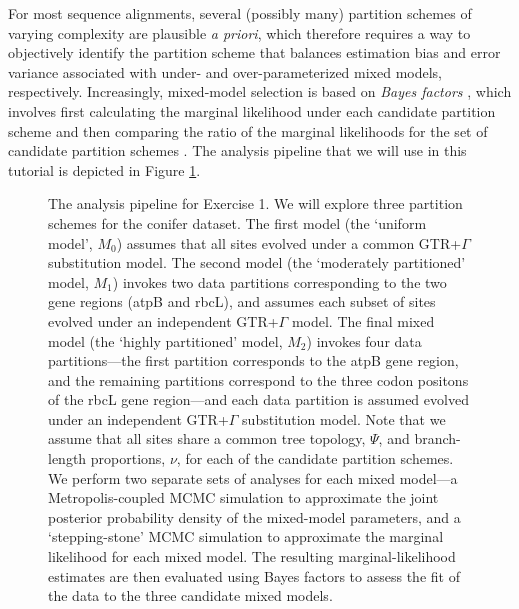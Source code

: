 \documentclass[11pt]{article}
\begin{document}
For most sequence alignments, several (possibly many) partition schemes of varying complexity are plausible {\it a priori}, which therefore requires a way to objectively identify the partition scheme that balances estimation bias and error variance associated with under- and over-parameterized mixed models, respectively.
Increasingly, mixed-model selection is based on \textit{Bayes factors} \citep[{\it e.g.},][]{suchard01}, which involves first calculating the marginal likelihood under each candidate partition scheme and then comparing the ratio of the marginal likelihoods for the set of candidate partition schemes \citep{brandley05,nylander04,mcguire07}.
The analysis pipeline that we will use in this tutorial is depicted in Figure \ref{pipeline}.
\begin{figure}[h!]
\centering
{}
\caption{\small The analysis pipeline for Exercise 1. We will explore three partition schemes for the conifer dataset.
The first model (the `uniform model', $M_0$) assumes that all sites evolved under a common GTR+$\Gamma$ substitution model.
The second model (the `moderately partitioned' model, $M_1$) invokes two data partitions corresponding to the two gene regions (atpB and rbcL), and assumes each subset of sites evolved under an independent GTR+$\Gamma$ model.
The final mixed model (the `highly partitioned' model, $M_2$) invokes four data partitions---the first partition corresponds to the atpB gene region, and the remaining partitions correspond to the three codon positons of the rbcL gene region---and each data partition is assumed evolved under an independent GTR+$\Gamma$ substitution model.
Note that we assume that all sites share a common tree topology, $\Psi$, and branch-length proportions, $\nu$, for each of the candidate partition schemes.
We perform two separate sets of analyses for each mixed model---a Metropolis-coupled MCMC simulation to approximate the joint posterior probability density of the mixed-model parameters, and a `stepping-stone' MCMC simulation to approximate the marginal likelihood for each mixed model.
The resulting marginal-likelihood estimates are then evaluated using Bayes factors to assess the fit of the data to the three candidate mixed models.  
}
\label{pipeline}
\end{figure}
 
\end{document}
